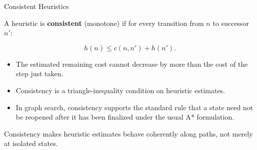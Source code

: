 \documentclass[aspectratio=169,10pt]{beamer}
\begin{document}
\begin{frame}[shrink=20]{Consistent Heuristics}
  \begin{cpdefinition}
    A heuristic is \textbf{consistent} (monotone) if for every transition from $n$ to successor $n'$:
  \end{cpdefinition}

  \[
    h(n)\le c(n,n')+h(n').
  \]

  \begin{itemize}
    \item The estimated remaining cost cannot decrease by more than the cost of the step just taken.
    \item Consistency is a triangle-inequality condition on heuristic estimates.
    \item In graph search, consistency supports the standard rule that a state need not be reopened after it has been finalized under the usual A* formulation.
  \end{itemize}

  \begin{keyidea}
    Consistency makes heuristic estimates behave coherently along paths, not merely at isolated states.
  \end{keyidea}
\end{frame}
\end{document}
